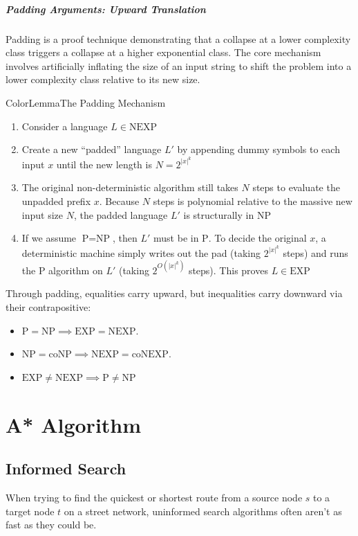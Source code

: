 \documentclass[a4paper, 11pt]{report}
\begin{document}
\paragraph{Padding Arguments: Upward Translation}
Padding is a proof technique demonstrating that a collapse at a lower complexity class triggers a collapse at a higher exponential class. The core mechanism involves artificially inflating the size of an input string to shift the problem into a lower complexity class relative to its new size.

\begin{cframe}{ColorLemma}{The Padding Mechanism}
    \begin{enumerate}
        \item  Consider a language $L \in \text{NEXP}$        \item Create a new ``padded'' language $L'$ by appending dummy symbols to each input $x$ until the new length is $N = 2^{|x|^k}$
        \item  The original non-deterministic algorithm still takes $N$ steps to evaluate the unpadded prefix $x$. Because $N$ steps is polynomial relative to the massive new input size $N$, the padded language $L'$ is structurally in $\text{NP}$
        \item If we assume $\text{P} = \text{NP}$, then $L'$ must be in $\text{P}$. To decide the original $x$, a deterministic machine simply writes out the pad (taking $2^{|x|^k}$ steps) and runs the $\text{P}$ algorithm on $L'$ (taking $2^{O(|x|^k)}$ steps). This proves $L \in \text{EXP}$
    \end{enumerate}
\end{cframe}

Through padding, equalities carry upward, but inequalities carry downward via their contrapositive:
\begin{itemize}
    \item $\text{P} = \text{NP} \implies \text{EXP} = \text{NEXP}$.
    \item $\text{NP} = \text{coNP} \implies \text{NEXP} = \text{coNEXP}$.
    \item $\text{EXP} \neq \text{NEXP} \implies \text{P} \neq \text{NP}$
\end{itemize}

\chapter{A* Algorithm}

\section{Informed Search}
When trying to find the quickest or shortest route from a source node $s$ to a target node $t$ on a street network, uninformed search algorithms often aren't as fast as they could be. 
\end{document}
